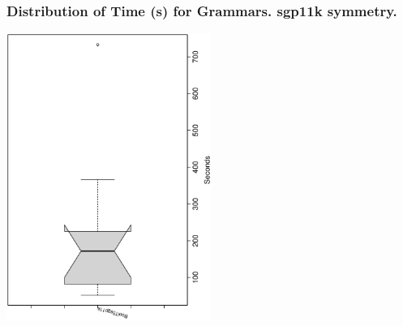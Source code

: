  \begin{frame}
 \frametitle{ Distribution of Time (s) for Grammars. sgp11k  symmetry. }
 \begin{center}
\includegraphics[width=0.5\textwidth, angle=-90]
{ExpFboxplottSeconds009.eps}
 \end{center}
 \label{ExpFboxplottSeconds009.eps}  
 \end{frame}

